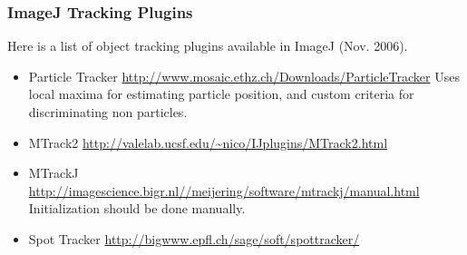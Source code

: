 \subsubsection{ImageJ Tracking Plugins}

Here is a list of object tracking plugins available in ImageJ (Nov. 2006).

\begin{itemize}
\item Particle Tracker
\subitem \url{http://www.mosaic.ethz.ch/Downloads/ParticleTracker}
\subitem Uses local maxima for estimating particle position, and custom criteria
for discriminating non particles. 

\item MTrack2
\subitem \url{http://valelab.ucsf.edu/~nico/IJplugins/MTrack2.html}

\item MTrackJ
\subitem \url{http://imagescience.bigr.nl//meijering/software/mtrackj/manual.html}
\subitem Initialization should be done manually.

\item Spot Tracker
\subitem \url{http://bigwww.epfl.ch/sage/soft/spottracker/}
\end{itemize}


